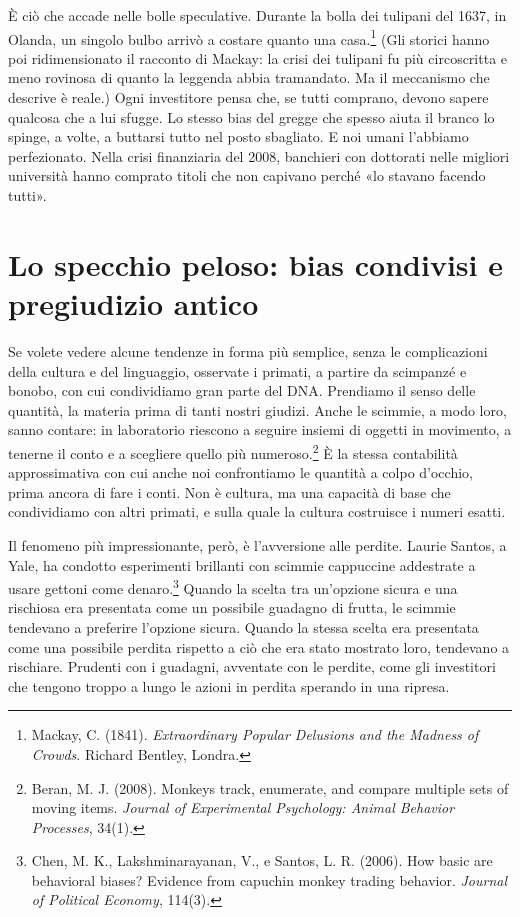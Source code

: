 È ciò che accade nelle bolle speculative. Durante la bolla dei tulipani del 1637, in Olanda, un singolo bulbo arrivò a costare quanto una casa.\footnote{Mackay, C. (1841). \textit{Extraordinary Popular Delusions and the Madness of Crowds}. Richard Bentley, Londra.} (Gli storici hanno poi ridimensionato il racconto di Mackay: la crisi dei tulipani fu più circoscritta e meno rovinosa di quanto la leggenda abbia tramandato. Ma il meccanismo che descrive è reale.) Ogni investitore pensa che, se tutti comprano, devono sapere qualcosa che a lui sfugge. Lo stesso bias del gregge che spesso aiuta il branco lo spinge, a volte, a buttarsi tutto nel posto sbagliato. E noi umani l'abbiamo perfezionato. Nella crisi finanziaria del 2008, banchieri con dottorati nelle migliori università hanno comprato titoli che non capivano perché «lo stavano facendo tutti».

\section{Lo specchio peloso: bias condivisi e pregiudizio antico}

Se volete vedere alcune tendenze in forma più semplice, senza le complicazioni della cultura e del linguaggio, osservate i primati, a partire da scimpanzé e bonobo, con cui condividiamo gran parte del DNA. Prendiamo il senso delle quantità, la materia prima di tanti nostri giudizi. Anche le scimmie, a modo loro, sanno contare: in laboratorio riescono a seguire insiemi di oggetti in movimento, a tenerne il conto e a scegliere quello più numeroso.\footnote{Beran, M. J. (2008). Monkeys track, enumerate, and compare multiple sets of moving items. \textit{Journal of Experimental Psychology: Animal Behavior Processes}, 34(1).} È la stessa contabilità approssimativa con cui anche noi confrontiamo le quantità a colpo d'occhio, prima ancora di fare i conti. Non è cultura, ma una capacità di base che condividiamo con altri primati, e sulla quale la cultura costruisce i numeri esatti.

Il fenomeno più impressionante, però, è l'avversione alle perdite. Laurie Santos, a Yale, ha condotto esperimenti brillanti con scimmie cappuccine addestrate a usare gettoni come denaro.\footnote{Chen, M. K., Lakshminarayanan, V., e Santos, L. R. (2006). How basic are behavioral biases? Evidence from capuchin monkey trading behavior. \textit{Journal of Political Economy}, 114(3).} Quando la scelta tra un'opzione sicura e una rischiosa era presentata come un possibile guadagno di frutta, le scimmie tendevano a preferire l'opzione sicura. Quando la stessa scelta era presentata come una possibile perdita rispetto a ciò che era stato mostrato loro, tendevano a rischiare. Prudenti con i guadagni, avventate con le perdite, come gli investitori che tengono troppo a lungo le azioni in perdita sperando in una ripresa.

